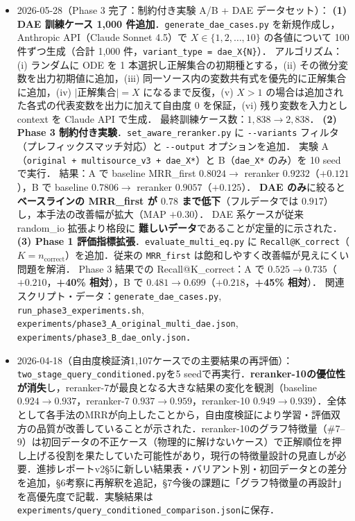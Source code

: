 \documentclass[11pt,a4paper]{jsarticle}
\begin{document}
\begin{itemize}[nosep]
  \item 2026-05-28（Phase 3 完了：制約付き実験 A/B + DAE データセット）：
    \textbf{(1) DAE 訓練ケース 1,000 件追加}．\texttt{generate\_dae\_cases.py} を新規作成し，Anthropic API（Claude Sonnet 4.5）で
    $X \in \{1, 2, \ldots, 10\}$ の各値について 100 件ずつ生成（合計 1,000 件，\texttt{variant\_type = dae\_X\{N\}}）．
    アルゴリズム：(i) ランダムに ODE を 1 本選択し正解集合の初期種とする，(ii) その微分変数を出力初期値に追加，(iii) 同一ソース内の変数共有式を優先的に正解集合に追加，(iv) $|$正解集合$|=X$ になるまで反復，(v) $X>1$ の場合は追加された各式の代表変数を出力に加えて自由度 0 を保証，(vi) 残り変数を入力とし context を Claude API で生成．
    最終訓練ケース数：$1{,}838 \to 2{,}838$．
    \textbf{(2) Phase 3 制約付き実験}．\texttt{set\_aware\_reranker.py} に \texttt{-{}-variants} フィルタ（プレフィックスマッチ対応）と \texttt{-{}-output} オプションを追加．
    実験 A（\texttt{original + multisource\_v3 + dae\_X*}）と B（\texttt{dae\_X*} のみ）を 10 seed で実行．
    結果：A で baseline MRR\_first $0.8024 \to$ reranker $0.9232$（$+0.121$），B で baseline $0.7806 \to$ reranker $0.9057$（$+0.125$）．
    \textbf{DAE のみ}に絞ると \textbf{ベースラインの MRR\_first が $0.78$ まで低下}（フルデータでは $0.917$）し，本手法の改善幅が拡大（MAP $+0.30$）．
    DAE 系ケースが従来 random\_io 拡張より格段に \textbf{難しいデータ}であることが定量的に示された．
    \textbf{(3) Phase 1 評価指標拡張}．\texttt{evaluate\_multi\_eq.py} に \texttt{Recall@K\_correct}（$K=n_{\text{correct}}$）を追加．従来の \texttt{MRR\_first} は飽和しやすく改善幅が見えにくい問題を解消．
    Phase 3 結果での Recall@K\_correct：A で $0.525 \to 0.735$（$+0.210$，\textbf{+40\% 相対}），B で $0.481 \to 0.699$（$+0.218$，\textbf{+45\% 相対}）．
    関連スクリプト・データ：\texttt{generate\_dae\_cases.py}, \texttt{run\_phase3\_experiments.sh}, \texttt{experiments/phase3\_A\_original\_multi\_dae.json}, \texttt{experiments/phase3\_B\_dae\_only.json}．

  \item 2026-04-18（自由度検証済1,107ケースでの主要結果の再評価）：\texttt{two\_stage\_query\_conditioned.py}を5 seedで再実行．\textbf{reranker-10の優位性が消失}し，reranker-7が最良となる大きな結果の変化を観測（baseline $0.924\to0.937$，reranker-7 $0.937\to\mathbf{0.959}$，reranker-10 $0.949\to0.939$）．全体として各手法のMRRが向上したことから，自由度検証により学習・評価双方の品質が改善していることが示された．reranker-10のグラフ特徴量（\#7--9）は初回データの不正ケース（物理的に解けないケース）で正解順位を押し上げる役割を果たしていた可能性があり，現行の特徴量設計の見直しが必要．進捗レポートv2§5に新しい結果表・バリアント別・初回データとの差分を追加，§6考察に再解釈を追記，§7今後の課題に「グラフ特徴量の再設計」を高優先度で記載．実験結果は\texttt{experiments/query\_conditioned\_comparison.json}に保存．


\end{itemize}
\end{document}
